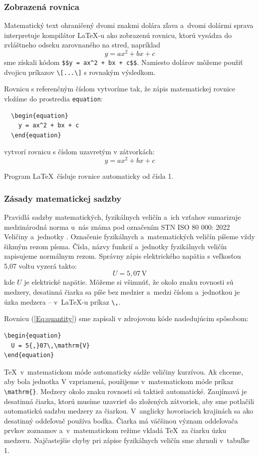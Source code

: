 \subsubsection{Zobrazená rovnica}
Matematický text ohraničený dvomi znakmi dolára zľava
a~dvomi dolármi sprava interpretuje kompilátor \LaTeX-u
ako zobrazenú rovnicu, ktorú vysádza do zvláštneho odseku
zarovnaného na stred, napríklad
$$
  y = ax^2 + bx + c
$$
sme získali kódom \verb|$$y = ax^2 + bx + c$$|.
Namiesto dolárov môžeme použiť dvojicu príkazov
\verb|\[...\]| s rovnakým výsledkom.

Rovnicu s referenčným číslom vytvoríme tak, že zápis matematickej
rovnice vložíme do prostredia \verb|equation|:
\begin{verbatim}
  \begin{equation}
    y = ax^2 + bx + c
  \end{equation}
\end{verbatim}
vytvorí rovnicu s číslom uzavretým v zátvorkách:
\begin{equation}
  y = ax^2 + bx + c
\end{equation}

Program \LaTeX\ čísluje rovnice automaticky od čísla 1.

\subsubsection{Zásady matematickej sadzby}
Pravidlá sadzby matematických, fyzikálnych veličín a~ich vzťahov
sumarizuje medzinárodná norma u~nás známa pod označením
STN ISO 80 000: 2022 Veličiny a~jednotky \cite{iso800001, iso800002}.
Označenie fyzikálnych a~matematických veličín píšeme vždy
šikmým rezom písma.
Čísla, názvy funkcií a~jednotky fyzikálnych veličín zapisujeme
normálnym rezom.
Správny zápis elektrického napätia s veľkosťou 5,07 voltu
vyzerá takto:
\begin{equation}\label{Eq:quantity}
  U = 5{,}07\,\mathrm{V}
\end{equation}
kde $U$ je elektrické napätie.
Môžeme si všimnúť, že okolo znaku rovnosti sú medzery,
desatinná čiarka sa píše bez medzier a~medzi číslom a~jednotkou
je úzka medzera -- v~\LaTeX-u príkaz \verb|\,|.

Rovnicu (\ref{Eq:quantity}) sme zapísali v zdrojovom kóde nasledujúcim spôsobom:
\begin{verbatim}
\begin{equation}
  U = 5{,}07\,\mathrm{V}
\end{equation}
\end{verbatim}
\TeX\ v~matematickom móde automaticky sádže veličiny kurzívou.
Ak chceme, aby bola jednotka V vzpriamená, použijeme
v~matematickom móde príkaz \verb|\mathrm{}|. Medzery okolo znaku rovnosti sú taktiež automatické.
Zaujímavá je desatinná čiarka, ktorú musíme uzavrieť do
zložených zátvoriek, aby sme potlačili automatickú sadzbu
medzery za čiarkou.
V~anglicky hovoriacich krajinách sa ako desatinný oddeľovač
používa bodka.
Čiarka má väčšinou význam oddeľovača prvkov zoznamov
a~v~matematickom režime vkladá \TeX\, za čiarku úzku medzeru.
Najčastejšie chyby pri zápise fyzikálnych veličín sme zhrnuli
v~tabuľke 1.

